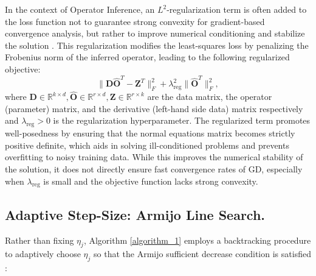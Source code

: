 In the context of Operator Inference, an $L^2$-regularization term is often added to the loss function not to guarantee strong convexity for gradient-based convergence analysis, but rather to improve numerical conditioning and stabilize the solution \cite{opinf2025}. This regularization modifies the least-squares loss by penalizing the Frobenius norm of the inferred operator, leading to the following regularized objective:\\
\begin{equation*}
    \bigl\|\mathbf{D}\widehat{\mathbf{O}}^T - \mathbf{Z}^T\bigr\|_F^2 + \lambda_{\mathrm{reg}}^2 \bigl\|\widehat{\mathbf{O}}^T\bigr\|_F^2,
    \label{eq:opinf_regularized_loss}
\end{equation*}
where $\mathbf{D}\in\mathbb{R}^{k\times d},\widehat{\mathbf{O}}\in\mathbb{R}^{r\times d},\mathbf{Z}\in\mathbb{R}^{r\times k}$ are the data matrix, the operator (parameter) matrix, and the derivative (left-hand side data) matrix respectively and $\lambda_{\mathrm{reg}} > 0$ is the regularization hyperparameter. The regularized term promotes well-posedness by ensuring that the normal equations matrix becomes strictly positive definite, which aids in solving ill-conditioned problems and prevents overfitting to noisy training data. While this improves the numerical stability of the solution, it does not directly ensure fast convergence rates of GD, especially when $\lambda_{\mathrm{reg}}$ is small and the objective function lacks strong convexity.

\subsection*{Adaptive Step-Size: Armijo Line Search.} 
Rather than fixing $\eta_j$, Algorithm \ref{algorithm_1} employs a backtracking procedure to adaptively choose $\eta_j$ so that the Armijo sufficient decrease condition is satisfied \cite{nocedal1999numerical}:

